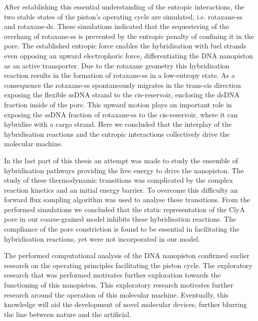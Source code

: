 After establishing this essential understanding of the entropic interactions, the two
stable states of the piston's operating cycle are simulated, i.e. rotaxane-ss and
rotaxane-ds. These simulations indicated that the sequestering of the overhang of
rotaxane-ss is prevented by the entropic penalty of confining it in the pore.
The established entropic force enables the hybridisation with fuel strands even opposing
an upward electrophoric force, differentiating the DNA nanopiston as an active
transporter. Due to the rotaxane geometry this hybridisation reaction results in the
formation of rotaxane-ss in a low-entropy state. As a consequence the rotaxane-ss
spontaneously migrates in the trans-cis direction exposing the flexible ssDNA strand to
the cis-reservoir, enclosing the dsDNA fraction inside of the pore. This
upward motion plays an important role in exposing the ssDNA fraction of rotaxane-ss to
the cis-reservoir, where it can hybridise with a cargo strand. Here we concluded that
the interplay of the hybridisation reactions and the entropic interactions collectively
drive the molecular machine.

In the last part of this thesis an attempt was made to study the ensemble of
hybridisation pathways providing the free energy to drive the nanopiston. The study of
these thermodynamic transitions was complicated by the complex reaction kinetics and an
initial energy barrier. To overcome this difficulty an forward flux sampling algorithm
was used to analyse these transitions. From the performed simulations we concluded that
the static representation of the ClyA pore in our coarse-grained model inhibits these
hybridisation reactions. The compliance of the pore constriction is found to be essential
in facilitating the hybridisation reactions, yet were not incorporated in our model.

The performed computational analysis of the DNA nanopiston confirmed earlier research on
the operating principles facilitating the piston cycle. The exploratory research that was
performed motivates further exploration towards the functioning of this nanopiston.
This exploratory research motivates further research around the operation of this
molecular machine. Eventually, this knowledge will aid the development of novel molecular
devices, further blurring the line between nature and the artificial.
